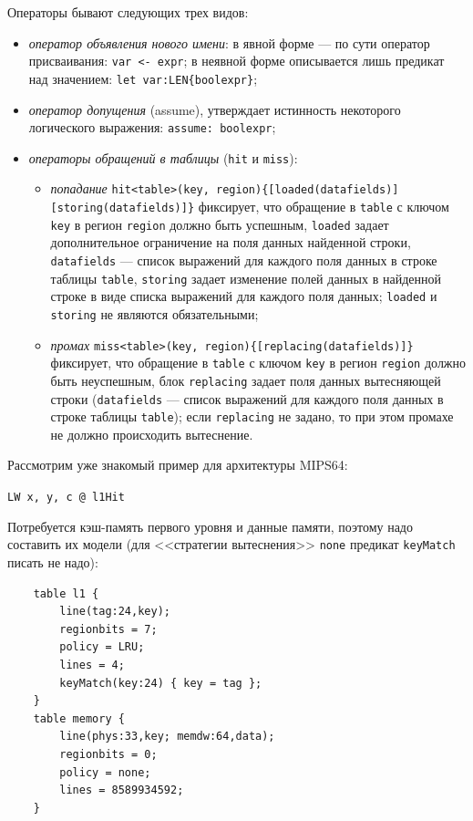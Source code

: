 Операторы бывают следующих трех видов:
\begin{itemize}
    \item \emph{оператор объявления нового имени}: в явной форме --- по сути
оператор присваивания: \texttt{var <- expr}; в неявной форме описывается лишь
предикат над значением: \texttt{let var:LEN\{boolexpr\}};
    \item \emph{оператор допущения} (assume), утверждает истинность некоторого
логического выражения: \texttt{assume: boolexpr};
    \item \emph{операторы обращений в таблицы} (\texttt{hit} и \texttt{miss}):
        \begin{itemize}
            \item \emph{попадание} \texttt{hit<table>(key,
region)\{[loaded(datafields)]}\\\texttt{[storing(datafields)]\}} фиксирует, что
обращение в \texttt{table} с ключом \texttt{key} в регион \texttt{region} должно
быть успешным, \texttt{loaded} задает дополнительное ограничение на поля данных найденной строки, \texttt{datafields} --- список выражений для каждого поля данных в строке таблицы \texttt{table}, \texttt{storing} задает изменение полей данных в
найденной строке в виде списка выражений для каждого поля данных; \texttt{loaded} и \texttt{storing} не являются обязательными;
            \item \emph{промах} \texttt{miss<table>(key,
region)\{[replacing(datafields)]\}}\\фиксирует, что обращение в \texttt{table} с
ключом \texttt{key} в регион \texttt{region} должно быть неуспешным, блок
\texttt{replacing} задает поля данных вытесняющей строки (\texttt{datafields}
--- список выражений для каждого поля данных в строке таблицы \texttt{table});
если \texttt{replacing} не задано, то при этом промахе не должно происходить
вытеснение.
        \end{itemize}
\end{itemize}


Рассмотрим уже знакомый пример для архитектуры MIPS64:

\texttt{LW x, y, c @ l1Hit}

Потребуется кэш-память первого уровня и данные памяти, поэтому надо составить их
модели (для <<стратегии вытеснения>> \texttt{none} предикат \texttt{keyMatch}
писать не надо):
\begin{verbatim}
    table l1 {
        line(tag:24,key);
        regionbits = 7;
        policy = LRU;
        lines = 4;
        keyMatch(key:24) { key = tag };
    }
    table memory {
        line(phys:33,key; memdw:64,data);
        regionbits = 0;
        policy = none;
        lines = 8589934592;
    }
\end{verbatim}

